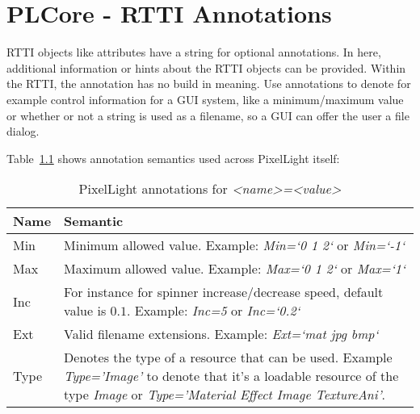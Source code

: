 \chapter{PLCore - \ac{RTTI} Annotations}
\label{Appendix:RTTIAnnotations}
\ac{RTTI} objects like attributes have a string for optional annotations. In here, additional information or hints about the \ac{RTTI} objects can be provided. Within the \ac{RTTI}, the annotation has no build in meaning. Use annotations to denote for example control information for a \ac{GUI} system, like a minimum/maximum value or whether or not a string is used as a filename, so a \ac{GUI} can offer the user a file dialog.

Table~\ref{Table:PixelLightAnnotations} shows annotation semantics used across PixelLight itself:
\begin{table}[htb]
	\centering
	\begin{tabular}{|l|p{}|}
		\hline
		\textbf{Name} & \textbf{Semantic}\\
		\hline
		\hline
		Min  & Minimum allowed value. Example: \emph{Min=`0 1 2`} or \emph{Min=`-1`}\\
		\hline
		Max  & Maximum allowed value. Example: \emph{Max=`0 1 2`} or \emph{Max=`1`}\\
		\hline
		Inc  & For instance for spinner increase/decrease speed, default value is $0.1$. Example: \emph{Inc=5} or \emph{Inc=`0.2`}\\
		\hline
		Ext  & Valid filename extensions. Example: \emph{Ext=`mat jpg bmp`}\\
		\hline
		Type & Denotes the type of a resource that can be used. Example \emph{Type='Image'} to denote that it's a loadable resource of the type \emph{Image} or \emph{Type='Material Effect Image TextureAni'}.\\
		\hline
	\end{tabular} 
	\caption{PixelLight annotations for \emph{<name>=<value>}}
	\label{Table:PixelLightAnnotations}
\end{table}
